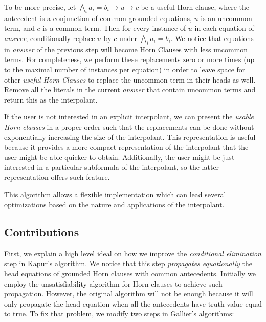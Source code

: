 \begin{itemize}
  To be more precise, let $\bigwedge_i a_i = b_i \rightarrow u \mapsto c$ be a useful Horn clause,
  where the antecedent is a conjunction of common grounded equations, $u$ is an uncommon term,
  and $c$ is a common term.
  Then for every instance of $u$ in each equation of \emph{answer}, conditionally replace $u$
  by $c$ under $\bigwedge_i a_i = b_i$.
  We notice that equations in \emph{answer}  of the previous step will become Horn Clauses with
  less uncommon terms. For completeness, we perform these replacements zero or more times
  (up to the maximal number of instances per equation) in order to leave space for other
  \emph{useful Horn Clauses} to replace the uncommon term in their heads as well.
  Remove all the literals in the current \emph{answer} that contain uncommon terms and return this
  as the interpolant.
\end{itemize}

If the user is not interested in an explicit interpolant, we can present the \emph{usable Horn
  clauses} in a proper order such that the replacements can be done without exponentially increasing
the size of the interpolant. This representation is useful because it provides a more compact
representation of the interpolant that the user might be able quicker to obtain.
Additionally, the user might be just interested in a particular subformula of the interpolant, so the
latter representation offers such feature.

This algorithm allows a flexible implementation which can lead several optimizations
based on the nature and applications of the interpolant.

\subsection{Contributions}

First, we explain a high level ideal on how we improve the \emph{conditional elimination}
step in Kapur's algorithm. We notice that this step \emph{propagates equationally} the
head equations of grounded Horn clauses with common antecedents. Initially we employ the
unsatisfiability algorithm for Horn clauses to achieve such propagation. However, the original
algorithm will not be enough because it will only propagate the head equation when all the
antecedents have truth value equal to true. To fix that problem, we modify two steps in Gallier's
algorithms:

